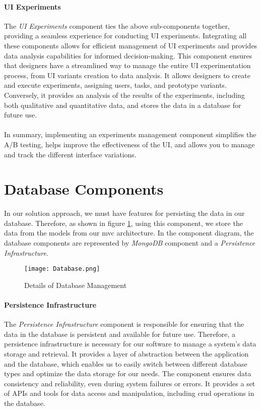 \paragraph{UI Experiments}
The \textit{UI Experiments} component ties the above sub-components together, providing a seamless experience for conducting UI experiments. 
Integrating all these components allows for efficient management of UI experiments and provides data analysis capabilities for informed decision-making.
This component ensures that designers have a streamlined way to manage the entire UI experimentation process, from UI variants creation to data analysis. 
It allows designers to create and execute experiments, assigning users, tasks, and prototype variants. 
Conversely, it provides an analysis of the results of the experiments, including both qualitative and quantitative data, and stores the data in a database for future use.\\\\
In summary, implementing an experiments management component simplifies the A/B testing, helps improve the effectiveness of the UI, and allows you to manage and track the different interface variations.

\clearpage
\section{Database Components}
\label{sc:section:persistance}
In our solution approach, we must have features for persisting the data in our database.
Therefore, as shown in figure \ref{fig:sc:database}, using this component, we store the data from the models from our \ac{mvc} architecture.
In the component diagram, the database components are represented by \textit{MongoDB} component and a \textit{Persistence Infrastructure}.

\begin{figure}[htbp!]
    \centering    
    \texttt{[image: Database.png]} 
    \caption[Details of Database Management]{Details of Database Management}
    \label{fig:sc:database}
\end{figure}

\paragraph{Persistence Infrastructure}
The \textit{Persistence Infrastructure} component is responsible for ensuring that the data in the database is persistent and available for future use.
Therefore, a persistence infrastructure is necessary for our software to manage a system's data storage and retrieval. 
It provides a layer of abstraction between the application and the database, which enables us to easily switch between different database types and optimize the data storage for our needs. 
The component ensures data consistency and reliability, even during system failures or errors. 
It provides a set of APIs and tools for data access and manipulation, including \ac{crud} operations in the database.

